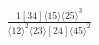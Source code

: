 \documentclass[varwidth, border=5pt]{standalone}
\begin{document}
\begin{my}
$\begin{gathered}
\scriptscriptstyle\frac{1[34]⟨15⟩⟨25⟩^3}{⟨12⟩^2⟨23⟩[24]⟨45⟩^2}
\end{gathered}$
\end{my}
\end{document}
